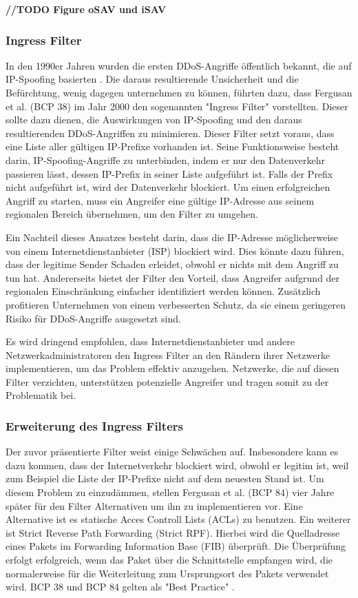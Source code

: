 \documentclass[sigplan,screen]{acmart}
\begin{document}
\textbf{//TODO Figure oSAV und iSAV}

\subsubsection{Ingress Filter}
In den 1990er Jahren wurden die ersten DDoS-Angriffe öffentlich bekannt, die auf IP-Spoofing basierten \cite{CRP01}. Die daraus resultierende Unsicherheit und die Befürchtung, wenig dagegen unternehmen zu können, führten dazu, dass Fergusan et al. (BCP 38) \cite{Ingress01} im Jahr 2000 den sogenannten "Ingress Filter" vorstellten. Dieser sollte dazu dienen, die Auswirkungen von IP-Spoofing und den daraus resultierenden DDoS-Angriffen zu minimieren. Dieser Filter setzt voraus, dass eine Liste aller gültigen IP-Prefixe vorhanden ist. Seine Funktionsweise besteht darin, IP-Spoofing-Angriffe zu unterbinden, indem er nur den Datenverkehr passieren lässt, dessen IP-Prefix in seiner Liste aufgeführt ist. Falls der Prefix nicht aufgeführt ist, wird der Datenverkehr blockiert. Um einen erfolgreichen Angriff zu starten, muss ein Angreifer eine gültige IP-Adresse aus seinem regionalen Bereich übernehmen, um den Filter zu umgehen.

Ein Nachteil dieses Ansatzes besteht darin, dass die IP-Adresse möglicherweise von einem Internetdienstanbieter (ISP) blockiert wird. Dies könnte dazu führen, dass der legitime Sender Schaden erleidet, obwohl er nichts mit dem Angriff zu tun hat. Andererseits bietet der Filter den Vorteil, dass Angreifer aufgrund der regionalen Einschränkung einfacher identifiziert werden können. Zusätzlich profitieren Unternehmen von einem verbesserten Schutz, da sie einem geringeren Risiko für DDoS-Angriffe ausgesetzt sind.

Es wird dringend empfohlen, dass Internetdienstanbieter und andere Netzwerkadministratoren den Ingress Filter an den Rändern ihrer Netzwerke implementieren, um das Problem effektiv anzugehen. Netzwerke, die auf diesen Filter verzichten, unterstützen potenzielle Angreifer und tragen somit zu der Problematik bei.

\subsubsection{Erweiterung des Ingress Filters}
Der zuvor präsentierte Filter weist einige Schwächen auf. Insbesondere kann es dazu kommen, dass der Internetverkehr blockiert wird, obwohl er legitim ist, weil zum Beispiel die Liste der IP-Prefixe nicht auf dem neuesten Stand ist. Um diesem Problem zu einzudämmen, stellen Fergusan et al. (BCP 84) \cite{Bcp84} vier Jahre später für den Filter Alternativen um ihn zu implementieren vor. Eine Alternative ist es statische Acces Controll Lists (ACLs) zu benutzen. Ein weiterer ist Strict Reverse Path Forwarding (Strict RPF). Hierbei wird die Quelladresse eines Pakets im Forwarding Information Base (FIB) überprüft. Die Überprüfung erfolgt erfolgreich, wenn das Paket über die Schnittstelle empfangen wird, die normalerweise für die Weiterleitung zum Ursprungsort des Pakets verwendet wird. BCP 38 und BCP 84 gelten als "Best Practice" \cite{Hal01}.
\end{document}
